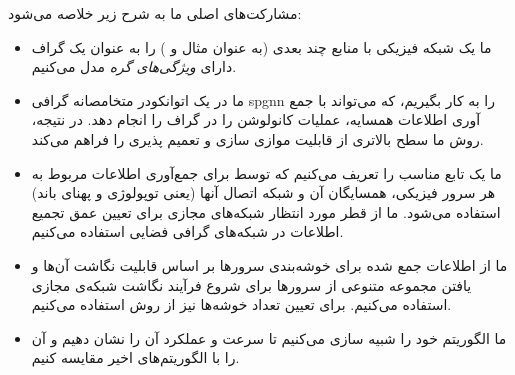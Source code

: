 مشارکت‌های اصلی ما به شرح زیر خلاصه ‌می‌شود:
\begin{itemize}
	\item 
	ما یک شبکه فیزیکی با منابع چند بعدی (به عنوان مثال  و ) را به عنوان یک گراف دارای \emph{ویژگی‌های گره} مدل ‌می‌کنیم.
	\item 
	ما در یک  اتوانکودر متخامصانه گرافی \gls{spgnn} را به کار بگیریم، که ‌می‌تواند با جمع آوری اطلاعات همسایه، عملیات کانولوشن را در گراف را انجام دهد. در نتیجه، روش ما سطح بالاتری از قابلیت موازی سازی و تعمیم پذیری را فراهم می‌کند.
	\item 
	ما یک تابع مناسب را تعریف ‌می‌کنیم که توسط  برای جمع‌آوری اطلاعات مربوط به هر سرور فیزیکی، همسایگان آن و شبکه اتصال  آنها (یعنی  توپولوژی و پهنای باند) استفاده ‌می‌شود. ما از قطر مورد انتظار شبکه‌های مجازی برای تعیین عمق تجمیع اطلاعات در شبکه‌های گرافی فضایی استفاده ‌می‌کنیم.
	\item 
	ما از اطلاعات جمع شده برای خوشه‌بندی سرورها بر اساس قابلیت نگاشت‌ آن‌ها و یافتن مجموعه متنوعی از سرورها برای شروع فرآیند نگاشت شبکه‌ی مجازی استفاده ‌می‌کنیم. برای تعیین تعداد خوشه‌ها نیز از روش  
	\cite{elbowMethod} 
	استفاده ‌می‌کنیم.
	\item 
	ما الگوریتم خود را شبیه سازی ‌می‌کنیم تا سرعت و عملکرد آن را نشان دهیم و آن را با الگوریتم‌های اخیر  مقایسه کنیم.
	
\end{itemize}
